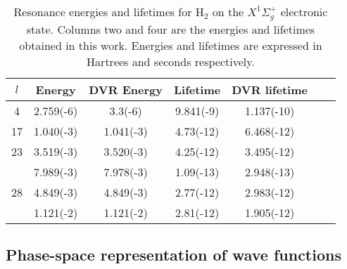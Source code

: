 \documentclass[%
 aip,
 numerical,
 jcp,
 floatfix,
rsi,%
amsmath,amssymb,
reprint,%
author-year%
]{revtex4-1}
\begin{document}
\begin{table}[htb]
\caption{Resonance energies and lifetimes for H$_{2}$ on the $X^1\Sigma_g^+$ electronic state. Columns two and four are the energies and lifetimes obtained in this work. Energies and lifetimes are expressed in Hartrees and seconds respectively.  \label{tab_resonances}}
\begin{ruledtabular}
\begin{tabular}{c c c c c c c}
  $l$   &  Energy & DVR Energy & Lifetime & DVR lifetime \\
   \hline
   4     &  2.759(-6)  &  3.3(-6)    &   9.841(-9)  & 1.137(-10)      \\
   \hline
   17    &  1.040(-3) &  1.041(-3)  &  4.73(-12)  & 6.468(-12)    \\
   \hline
   23    &  3.519(-3)  &  3.520(-3) &   4.25(-12)  & 3.495(-12)     \\
         &  7.989(-3)  &  7.978(-3) &   1.09(-13)  & 2.948(-13)     \\
   \hline
   28    &  4.849(-3)  &  4.849(-3) &  2.77(-12)  & 2.983(-12)   \\
         &  1.121(-2)  &  1.121(-2) &  2.81(-12)  & 1.905(-12)    \\
\end{tabular}
\end{ruledtabular}
\end{table}

\subsection{Phase-space representation of wave functions}
\end{document}
